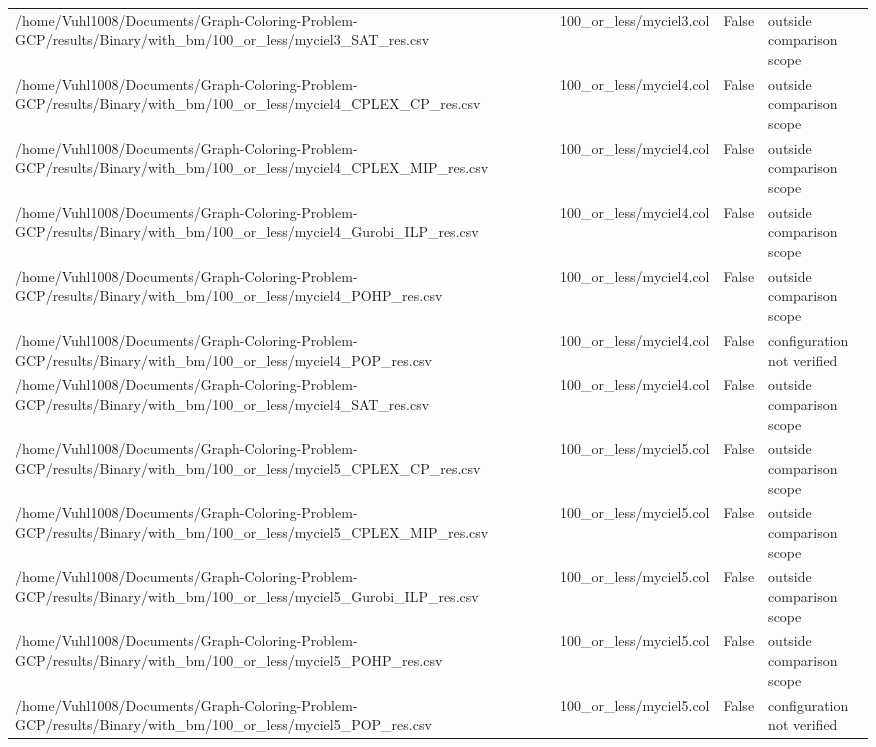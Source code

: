 \begin{table}[htbp]
\begin{tabular}{llll}
/home/Vuhl1008/Documents/Graph-Coloring-Problem-GCP/results/Binary/with\_bm/100\_or\_less/myciel3\_SAT\_res.csv & 100\_or\_less/myciel3.col & False & outside comparison scope \\
/home/Vuhl1008/Documents/Graph-Coloring-Problem-GCP/results/Binary/with\_bm/100\_or\_less/myciel4\_CPLEX\_CP\_res.csv & 100\_or\_less/myciel4.col & False & outside comparison scope \\
/home/Vuhl1008/Documents/Graph-Coloring-Problem-GCP/results/Binary/with\_bm/100\_or\_less/myciel4\_CPLEX\_MIP\_res.csv & 100\_or\_less/myciel4.col & False & outside comparison scope \\
/home/Vuhl1008/Documents/Graph-Coloring-Problem-GCP/results/Binary/with\_bm/100\_or\_less/myciel4\_Gurobi\_ILP\_res.csv & 100\_or\_less/myciel4.col & False & outside comparison scope \\
/home/Vuhl1008/Documents/Graph-Coloring-Problem-GCP/results/Binary/with\_bm/100\_or\_less/myciel4\_POHP\_res.csv & 100\_or\_less/myciel4.col & False & outside comparison scope \\
/home/Vuhl1008/Documents/Graph-Coloring-Problem-GCP/results/Binary/with\_bm/100\_or\_less/myciel4\_POP\_res.csv & 100\_or\_less/myciel4.col & False & configuration not verified \\
/home/Vuhl1008/Documents/Graph-Coloring-Problem-GCP/results/Binary/with\_bm/100\_or\_less/myciel4\_SAT\_res.csv & 100\_or\_less/myciel4.col & False & outside comparison scope \\
/home/Vuhl1008/Documents/Graph-Coloring-Problem-GCP/results/Binary/with\_bm/100\_or\_less/myciel5\_CPLEX\_CP\_res.csv & 100\_or\_less/myciel5.col & False & outside comparison scope \\
/home/Vuhl1008/Documents/Graph-Coloring-Problem-GCP/results/Binary/with\_bm/100\_or\_less/myciel5\_CPLEX\_MIP\_res.csv & 100\_or\_less/myciel5.col & False & outside comparison scope \\
/home/Vuhl1008/Documents/Graph-Coloring-Problem-GCP/results/Binary/with\_bm/100\_or\_less/myciel5\_Gurobi\_ILP\_res.csv & 100\_or\_less/myciel5.col & False & outside comparison scope \\
/home/Vuhl1008/Documents/Graph-Coloring-Problem-GCP/results/Binary/with\_bm/100\_or\_less/myciel5\_POHP\_res.csv & 100\_or\_less/myciel5.col & False & outside comparison scope \\
/home/Vuhl1008/Documents/Graph-Coloring-Problem-GCP/results/Binary/with\_bm/100\_or\_less/myciel5\_POP\_res.csv & 100\_or\_less/myciel5.col & False & configuration not verified \\

\end{tabular}
\end{table}

